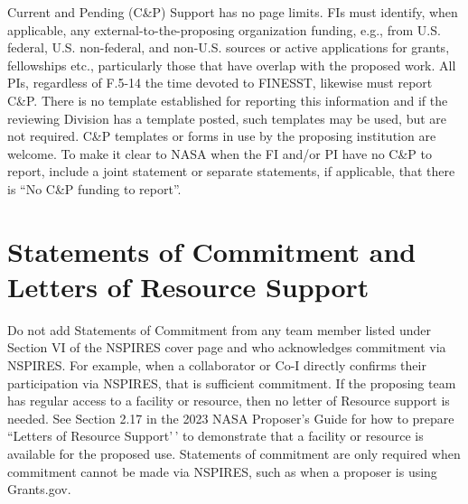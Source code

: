 \documentclass[
  letterpaper,
  DIV=11,
  numbers=noendperiod,
  oneside]{scrartcl}
\begin{document}
\begin{tcolorbox}[enhanced jigsaw, breakable, colframe=quarto-callout-note-color-frame, colback=white, titlerule=0mm, left=2mm, leftrule=.75mm, opacitybacktitle=0.6, coltitle=black, title=\textcolor{quarto-callout-note-color}{\faInfo}\hspace{0.5em}{Note}, bottomtitle=1mm, toprule=.15mm, arc=.35mm, toptitle=1mm, rightrule=.15mm, opacityback=0, colbacktitle=quarto-callout-note-color!10!white, bottomrule=.15mm]

Current and Pending (C\&P) Support has no page limits. FIs must
identify, when applicable, any external-to-the-proposing organization
funding, e.g., from U.S. federal, U.S. non-federal, and non-U.S. sources
or active applications for grants, fellowships etc., particularly those
that have overlap with the proposed work. All PIs, regardless of F.5-14
the time devoted to FINESST, likewise must report C\&P. There is no
template established for reporting this information and if the reviewing
Division has a template posted, such templates may be used, but are not
required. C\&P templates or forms in use by the proposing institution
are welcome. To make it clear to NASA when the FI and/or PI have no C\&P
to report, include a joint statement or separate statements, if
applicable, that there is ``No C\&P funding to report''.

\end{tcolorbox}

\section{Statements of Commitment and Letters of Resource
Support}\label{statements-of-commitment-and-letters-of-resource-support}

\begin{tcolorbox}[enhanced jigsaw, breakable, colframe=quarto-callout-note-color-frame, colback=white, titlerule=0mm, left=2mm, leftrule=.75mm, opacitybacktitle=0.6, coltitle=black, title=\textcolor{quarto-callout-note-color}{\faInfo}\hspace{0.5em}{Note}, bottomtitle=1mm, toprule=.15mm, arc=.35mm, toptitle=1mm, rightrule=.15mm, opacityback=0, colbacktitle=quarto-callout-note-color!10!white, bottomrule=.15mm]

Do not add Statements of Commitment from any team member listed under
Section VI of the NSPIRES cover page and who acknowledges commitment via
NSPIRES. For example, when a collaborator or Co-I directly confirms
their participation via NSPIRES, that is sufficient commitment. If the
proposing team has regular access to a facility or resource, then no
letter of Resource support is needed. See Section 2.17 in the 2023 NASA
Proposer's Guide for how to prepare ``Letters of Resource Support'\,' to
demonstrate that a facility or resource is available for the proposed
use. Statements of commitment are only required when commitment cannot
be made via NSPIRES, such as when a proposer is using Grants.gov.

\end{tcolorbox}
\end{document}
